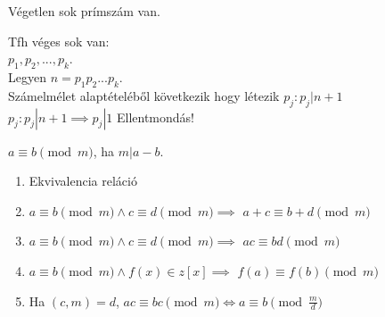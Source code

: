 \documentclass{beamer}
\begin{document}
\begin{frame}

\begin{tcolorbox}[title={Tétel: Eukleidész tétele}]
Végetlen sok prímszám van.
\end{tcolorbox}

\begin{tcolorbox}[title={Bizonyítás (Indirekt)}]
Tfh véges sok van:\\
$p_1, p_2, ... ,p_k$.\\
Legyen $n = p_1p_2...p_k$.\\
Számelmélet alaptételéből következik hogy létezik $p_j : p_j | n + 1$\\
$p_j : p_j | n + 1 \implies p_j | 1$ Ellentmondás!
\end{tcolorbox}
\end{frame}

\begin{frame}
\begin{tcolorbox}[title={Def.: Kanonikus alak, Módosított kanonikus alak}]
\end{tcolorbox}

\begin{tcolorbox}[title={Def.: Erathosztenész SZitája}]
\end{tcolorbox}
\end{frame}

\begin{frame}

\begin{tcolorbox}[title={Def.: Lineáris Kongruencia}]
$a \equiv b \pmod{m}$, ha $m | a - b$.
\end{tcolorbox}

\begin{tcolorbox}[title={Tétel: Kongruencia tulajdonságai}]
\begin{enumerate}
\item Ekvivalencia reláció
\item $a \equiv b \pmod{m} \land c \equiv d \pmod{m} \implies$ \textbf{$a + c \equiv b + d \pmod{m}$}
\item $a \equiv b \pmod{m} \land c \equiv d \pmod{m} \implies$ \textbf{$ac \equiv bd \pmod{m}$}
\item $a \equiv b \pmod{m} \land f(x) \in z[x] \implies$ \textbf{$f(a) \equiv f(b) \pmod{m}$}
\item Ha $(c, m) = d$, $ac \equiv bc \pmod{m} \iff a \equiv b \pmod{\frac{m}{d}}$
\end{enumerate}
\end{tcolorbox}

\begin{tcolorbox}[title={Ész}]
\end{tcolorbox}
\end{frame}
\end{document}
